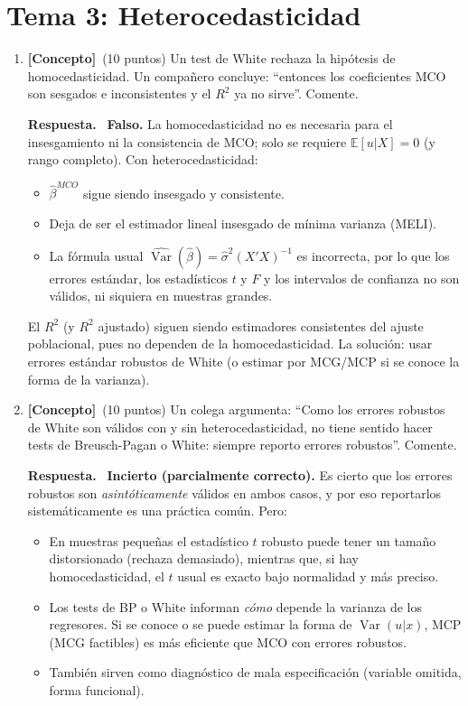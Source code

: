 \documentclass[12pt,letterpaper]{article}
\DeclareMathOperator{\var}{Var}
\newcommand{\E}[1]{\mathbb{E}\left[#1\right]}
\newenvironment{resp}{\begingroup\color{blue}\par\noindent\textbf{Respuesta.}\ }{\par\endgroup}
\newcommand{\tema}[1]{\section*{#1}}
\newcommand{\conc}{\textbf{[Concepto]}}
\begin{document}
\newpage
\tema{Tema 3: Heterocedasticidad}

\begin{enumerate}[1.]

\item \conc\ (10 puntos) Un test de White rechaza la hipótesis de homocedasticidad. Un compañero concluye: ``entonces los coeficientes MCO son sesgados e inconsistentes y el $R^2$ ya no sirve''. Comente.

\begin{resp}
\textbf{Falso.} La homocedasticidad no es necesaria para el insesgamiento ni la consistencia de MCO; solo se requiere $\E{u|X}=0$ (y rango completo). Con heterocedasticidad:
\begin{itemize}
\item $\hat\beta^{MCO}$ sigue siendo insesgado y consistente.
\item Deja de ser el estimador lineal insesgado de mínima varianza (MELI).
\item La fórmula usual $\widehat{\var}(\hat\beta)=\hat\sigma^2(X'X)^{-1}$ es incorrecta, por lo que los errores estándar, los estadísticos $t$ y $F$ y los intervalos de confianza no son válidos, ni siquiera en muestras grandes.
\end{itemize}
El $R^2$ (y $R^2$ ajustado) siguen siendo estimadores consistentes del ajuste poblacional, pues no dependen de la homocedasticidad. La solución: usar errores estándar robustos de White (o estimar por MCG/MCP si se conoce la forma de la varianza).
\end{resp}

\item \conc\ (10 puntos) Un colega argumenta: ``Como los errores robustos de White son válidos con y sin heterocedasticidad, no tiene sentido hacer tests de Breusch-Pagan o White: siempre reporto errores robustos''. Comente.

\begin{resp}
\textbf{Incierto (parcialmente correcto).} Es cierto que los errores robustos son \emph{asintóticamente} válidos en ambos casos, y por eso reportarlos sistemáticamente es una práctica común. Pero:
\begin{itemize}
\item En muestras pequeñas el estadístico $t$ robusto puede tener un tamaño distorsionado (rechaza demasiado), mientras que, si hay homocedasticidad, el $t$ usual es exacto bajo normalidad y más preciso.
\item Los tests de BP o White informan \emph{cómo} depende la varianza de los regresores. Si se conoce o se puede estimar la forma de $\var(u|x)$, MCP (MCG factibles) es más eficiente que MCO con errores robustos.
\item También sirven como diagnóstico de mala especificación (variable omitida, forma funcional).
\end{itemize}
\end{resp}


\end{enumerate}
\end{document}
